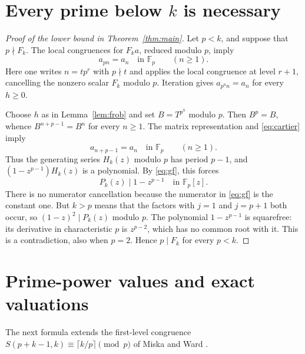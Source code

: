 \documentclass[11pt]{article}
\theoremstyle{remark}
\begin{document}
\section{Every prime below \texorpdfstring{$k$}{k} is necessary}
\begin{proof}[Proof of the lower bound in Theorem~\ref{thm:main}]
Let $p<k$, and suppose that $p\nmid F_k$. The local congruences for $F_ka$,
reduced modulo $p$, imply
\begin{equation}\label{eq:cartier}
 a_{pn}=a_n\quad\text{in }\mathbb F_p\qquad(n\geq1).
\end{equation}
Here one writes $n=tp^r$ with $p\nmid t$ and applies the local congruence
at level $r+1$, cancelling the nonzero scalar $F_k$ modulo $p$.
Iteration gives $a_{p^h n}=a_n$ for every $h\geq0$.

Choose $h$ as in Lemma~\ref{lem:frob} and set $B=T^{p^h}$ modulo $p$.
Then $B^p=B$, whence
$B^{n+p-1}=B^n$ for every $n\geq1$.
The matrix representation and \eqref{eq:cartier} imply
\[
 a_{n+p-1}=a_n\quad\text{in }\mathbb F_p\qquad(n\geq1).
\]
Thus the generating series $H_k(z)$ modulo $p$ has period $p-1$, and
$(1-z^{p-1})H_k(z)$ is a polynomial. By \eqref{eq:gf}, this forces
\[
 P_k(z)\mid1-z^{p-1}\quad\text{in }\mathbb F_p[z].
\]
There is no numerator cancellation because the numerator in \eqref{eq:gf}
is the constant one. But $k>p$ means that the factors with $j=1$ and
$j=p+1$ both occur, so $(1-z)^2\mid P_k(z)$ modulo $p$.
The polynomial $1-z^{p-1}$ is squarefree: its derivative in characteristic
$p$ is $z^{p-2}$, which has no common root with it. This is a contradiction,
also when $p=2$. Hence $p\mid F_k$ for every $p<k$.
\end{proof}

\section{Prime-power values and exact valuations}
The next formula extends the first-level congruence
$S(p+k-1,k)\equiv\lceil k/p\rceil\pmod p$ of Miska and Ward
\cite[Lemma~10]{MW}.
\end{document}
